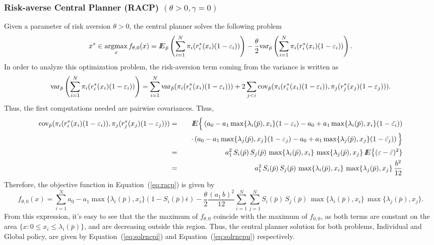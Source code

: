 \subsubsection{Risk-averse Central Planner (RACP) $(\theta>0,\gamma=0)$}
Given a parameter of risk aversion $\theta>0$, the central planner solves the following problem
\begin{equation}\label{eq:racp}
x^*\in\mathop{\rm argmax}_{x}  f_{\theta,0}(x)={I\kern-.35em E}_{\bar p}\left(\sum_{i=1}^N \pi_i(r^*_i(x_i)(1-\varepsilon_i))\right) - \frac{\theta}{2}{\mathop{\rm var}\nolimits}_{\bar p} \left(\sum_{i=1}^N \pi_i(r^*_i(x_i)(1-\varepsilon_i))\right).
\end{equation}
In order to analyze this optimization problem, the risk-aversion term coming from the variance is written as 
\[{\mathop{\rm var}\nolimits}_{\bar p}\left(\sum_{i=1}^N \pi_i(r^*_i(x_i)(1-\varepsilon_i))\right)=\sum_{i=1}^N {\mathop{\rm var}\nolimits}_{\bar p}(\pi_i(r^*_i(x_i)(1-\varepsilon_i)))+2\sum_{j<i}{\mathop{\rm cov}\nolimits}_{\bar p}(\pi_i(r^*_i(x_i)(1-\varepsilon_i)),\pi_j(r^*_j(x_j)(1-\varepsilon_j))).\]
Thus, the first computations needed are pairwise covariances.  Thus,
\begin{eqnarray*}
{\mathop{\rm cov}\nolimits}_{\bar p}(\pi_i(r^*_i(x_i)(1-\varepsilon_i)),\pi_j(r^*_j(x_j)(1-\varepsilon_j)))&=&{I\kern-.35em E}\Big\lbrace\left(a_0-a_1\max\{\lambda_i(\bar{p}),x_i\}(1-\varepsilon_i)-a_0+a_1\max\{\lambda_i(\bar{p}),x_i\}(1-\bar{\varepsilon_i})\right)\\
&&\quad\cdot\left(a_0-a_1\max\{\lambda_j(\bar{p}),x_j\}(1-\varepsilon_j)-a_0+a_1\max\{\lambda_j(\bar{p}),x_j\}(1-\bar{\varepsilon_j})\right)\Big\rbrace\\
&=&a_1^2\,S_i(\bar{p})\,S_j(\bar{p})\,\max\{\lambda_i(\bar{p}),x_i\}\,\max\{\lambda_j(\bar{p}),x_j\}\,{I\kern-.35em E}\big\lbrace (\varepsilon-\bar{\varepsilon})^2\}\\
&=&a_1^2\,S_i(\bar{p})\,S_j(\bar{p})\,\max\{\lambda_i(\bar{p}),x_i\}\,\max\{\lambda_j(\bar{p}),x_j\}\,\frac{b^ 2}{12}
\end{eqnarray*}
Therefore, the objective function in Equation~(\ref{eq:racp}) is given by
\[f_{\theta,0}(x)=\sum_{i=1}^N a_0-a_1\max\{\lambda_i(\bar{p}),x_i\}(1-S_i(\bar{p})\bar{\epsilon})-\frac{\theta}{2}\frac{(a_1\,b)^2}{12}\sum_{i=1}^N\sum_{j=1}^N S_i(\bar{p})\,S_j(\bar{p})\,\max\{\lambda_i(\bar{p}),x_i\}\,\max\{\lambda_j(\bar{p}),x_j\}.\]
From this expression, it's easy to see that the the maximum of $f_{\theta,0}$ coincide with the maximum of $f_{0,0}$, as both terms are constant on the area $\{x:0\leq x_i\leq \lambda_i(\bar{p})\}$, and are decreasing outside this region.  Thus, the central planner solution for both problems, Individual and Global policy, are given by Equation~(\ref{eq:solrncpi}) and Equation~(\ref{eq:solrncpu}) respectively.


